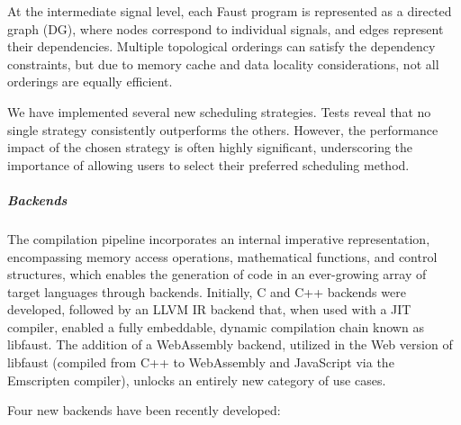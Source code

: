 At the intermediate signal level, each Faust program is represented as a directed graph (DG), where nodes correspond to individual signals, and edges represent their dependencies. Multiple topological orderings can satisfy the dependency constraints, but due to memory cache and data locality considerations, not all orderings are equally efficient.

We have implemented several new scheduling strategies. Tests reveal that no single strategy consistently outperforms the others. However, the performance impact of the chosen strategy is often highly significant, underscoring the importance of allowing users to select their preferred scheduling method.

\subparagraph{Backends}

The \F{} compilation pipeline incorporates an internal imperative
representation, encompassing memory access operations, mathematical
functions, and control structures, which enables the generation of code
in an ever-growing array of target languages through backends.
Initially, C and C++ backends were developed, followed by an LLVM IR
backend that, when used with a JIT compiler, enabled a fully embeddable,
dynamic compilation chain known as libfaust. The addition of a
WebAssembly backend, utilized in the Web version of libfaust (compiled
from C++ to WebAssembly and JavaScript via the Emscripten compiler),
unlocks an entirely new category of use cases.

Four new backends have been recently developed:

